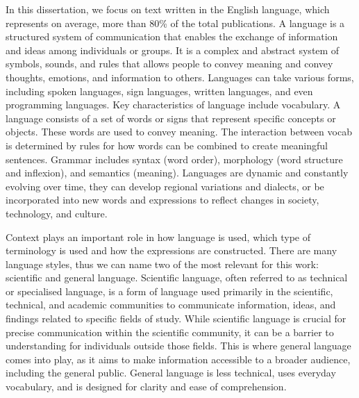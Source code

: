 In this dissertation, we focus on text written in the English language, which represents on average, more than 80\% of the total publications. 
A language is a structured system of communication that enables the exchange of information and ideas among individuals or groups. 
It is a complex and abstract system of symbols, sounds, and rules that allows people to convey meaning and convey thoughts, emotions, and information to others. 
Languages can take various forms, including spoken languages, sign languages, written languages, and even programming languages.
Key characteristics of language include vocabulary. A language consists of a set of words or signs that represent specific concepts or objects. 
These words are used to convey meaning.
The interaction between vocab is determined by rules for how words can be combined to create meaningful sentences. 
Grammar includes syntax (word order), morphology (word structure and inflexion), and semantics (meaning).
Languages are dynamic and constantly evolving over time, they can develop regional variations and dialects, or be incorporated into new words and expressions to reflect changes in society, technology, and culture. 

Context plays an important role in how language is used, which type of terminology is used and how the expressions are constructed. There are many language styles, thus we can name two of the most relevant for this work: scientific and general language.
Scientific language, often referred to as technical or specialised language, is a form of language used primarily in the scientific, technical, and academic communities to communicate information, ideas, and findings related to specific fields of study. 
While scientific language is crucial for precise communication within the scientific community, it can be a barrier to understanding for individuals outside those fields. This is where general language comes into play, as it aims to make information accessible to a broader audience, including the general public. General language is less technical, uses everyday vocabulary, and is designed for clarity and ease of comprehension.


